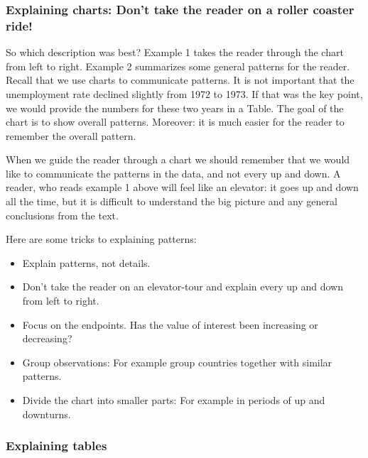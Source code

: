 \documentclass[
]{book}
\providecommand{\tightlist}{%
  \setlength{\itemsep}{0pt}\setlength{\parskip}{0pt}}
\begin{document}
\hypertarget{explaining-charts-dont-take-the-reader-on-a-roller-coaster-ride}{%
\subsubsection*{Explaining charts: Don't take the reader on a roller coaster ride!}\label{explaining-charts-dont-take-the-reader-on-a-roller-coaster-ride}}

So which description was best? Example 1 takes the reader through the chart from left to right. Example 2 summarizes some general patterns for the reader. Recall that we use charts to communicate patterns. It is not important that the unemployment rate declined slightly from 1972 to 1973. If that was the key point, we would provide the numbers for these two years in a Table. The goal of the chart is to show overall patterns. Moreover: it is much easier for the reader to remember the overall pattern.

When we guide the reader through a chart we should remember that we would like to communicate the patterns in the data, and not every up and down. A reader, who reads example 1 above will feel like an elevator: it goes up and down all the time, but it is difficult to understand the big picture and any general conclusions from the text.

Here are some tricks to explaining patterns:

\begin{itemize}
\tightlist
\item
  Explain patterns, not details.
\item
  Don't take the reader on an elevator-tour and explain every up and down from left to right.
\item
  Focus on the endpoints. Has the value of interest been increasing or decreasing?
\item
  Group observations: For example group countries together with similar patterns.
\item
  Divide the chart into smaller parts: For example in periods of up and downturns.
\end{itemize}

\hypertarget{explaining-tables}{%
\subsubsection*{Explaining tables}\label{explaining-tables}}
\end{document}
